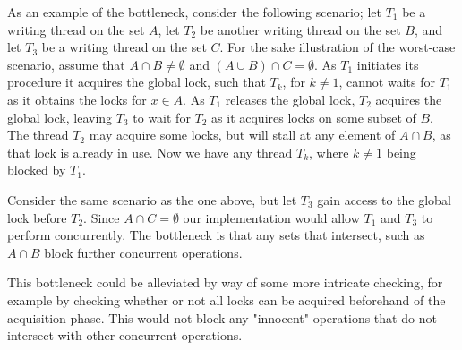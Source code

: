 As an example of the bottleneck, consider the following scenario; let $T_1$ be
a writing thread on the set $A$, let $T_2$ be another writing thread on the set
$B$, and let $T_3$ be a writing thread on the set $C$. For the sake illustration
of the worst-case scenario, assume that $A \cap B \neq \emptyset$ and $(A \cup B)
\cap C = \emptyset$. As $T_1$ initiates its procedure it acquires the global lock,
such that $T_k$, for $k \neq 1$, cannot waits for $T_1$ as it obtains the locks
for $x \in A$. As $T_1$ releases the global lock, $T_2$ acquires the global lock,
leaving $T_3$ to wait for $T_2$ as it acquires locks on some subset of $B$. The
thread $T_2$ may acquire some locks, but will stall at any element of $A \cap B$,
as that lock is already in use. Now we have any thread $T_k$, where $k \neq 1$
being blocked by $T_1$.

Consider the same scenario as the one above, but let $T_3$ gain access to the
global lock before $T_2$. Since $A \cap C = \emptyset$ our implementation would
allow $T_1$ and $T_3$ to perform concurrently. The bottleneck is that any sets
that intersect, such as $A \cap B$ block further concurrent operations.

This bottleneck could be alleviated by way of some more intricate checking, for
example by checking whether or not all locks can be acquired beforehand of the
acquisition phase. This would not block any "innocent" operations that do not
intersect with other concurrent operations.
